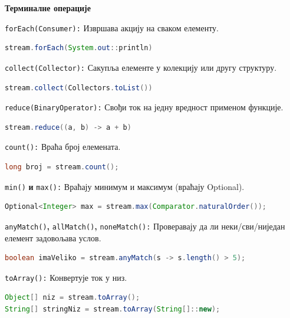 \textbf{Терминалне операције}

\texttt{forEach(Consumer):} Извршава акцију на сваком елементу.

\begin{lstlisting}[language=Java]
stream.forEach(System.out::println)
\end{lstlisting}


\texttt{collect(Collector):} Сакупља елементе у колекцију или другу структуру.

\begin{lstlisting}[language=Java]
stream.collect(Collectors.toList())
\end{lstlisting}


\texttt{reduce(BinaryOperator):} Свођи ток на једну вредност применом функције.

\begin{lstlisting}[language=Java]
stream.reduce((a, b) -> a + b)
\end{lstlisting}


\texttt{count():} Враћа број елемената.

\begin{lstlisting}[language=Java]
long broj = stream.count();
\end{lstlisting}


\texttt{min()}\textbf{ и }\texttt{max():} Враћају минимум и максимум (враћају Optional).

\begin{lstlisting}[language=Java]
Optional<Integer> max = stream.max(Comparator.naturalOrder());
\end{lstlisting}


\texttt{anyMatch()}\textbf{, }\texttt{allMatch()}\textbf{, }\texttt{noneMatch():} Проверавају да ли неки/сви/ниједан елемент задовољава услов.

\begin{lstlisting}[language=Java]
boolean imaVeliko = stream.anyMatch(s -> s.length() > 5);
\end{lstlisting}


\texttt{toArray():} Конвертује ток у низ.

\begin{lstlisting}[language=Java]
Object[] niz = stream.toArray();
String[] stringNiz = stream.toArray(String[]::new);
\end{lstlisting}


